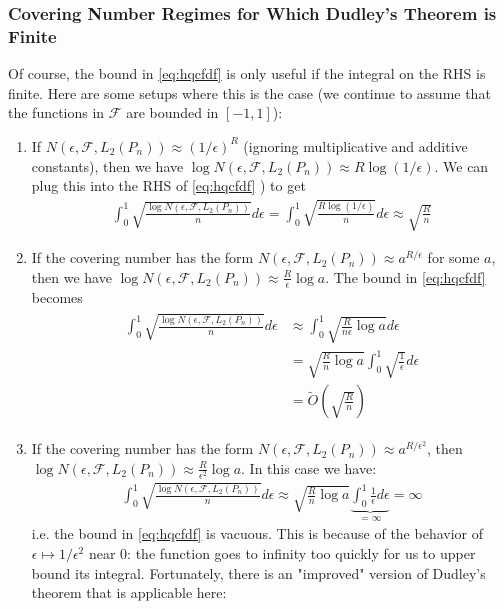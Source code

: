 \documentclass{article}
\begin{document}
\subsubsection{Covering Number Regimes for Which Dudley's Theorem is Finite}
Of course, the bound in \cref{eq:hqcfdf} is only useful if the integral on the RHS is finite. Here are some setups where this is the case (we continue to assume that the functions in $\mathcal{F}$ are bounded in $[-1,1]$):
\begin{enumerate}
    \item If $N\left(\epsilon, \mathcal{F}, L_{2}\left(P_{n}\right)\right) \approx(1 / \epsilon)^{R}$ (ignoring multiplicative and additive constants), then we have $\log N\left(\epsilon, \mathcal{F}, L_{2}\left(P_{n}\right)\right) \approx R \log (1 / \epsilon)$. We can plug this into the RHS of \cref{eq:hqcfdf} ) to get
\begin{align*}
\int_{0}^{1} \sqrt{\frac{\log N\left(\epsilon, \mathcal{F}, L_{2}\left(P_{n}\right)\right)}{n}} d \epsilon=\int_{0}^{1} \sqrt{\frac{R \log (1 / \epsilon)}{n}} d \epsilon \approx \sqrt{\frac{R}{n}}
\end{align*}
\item If the covering number has the form $N\left(\epsilon, \mathcal{F}, L_{2}\left(P_{n}\right)\right) \approx a^{R / \epsilon}$ for some $a$, then we have $\log N\left(\epsilon, \mathcal{F}, L_{2}\left(P_{n}\right)\right) \approx \frac{R}{\epsilon} \log a$. The bound in \cref{eq:hqcfdf} becomes
\begin{align*}
\begin{aligned}
\int_{0}^{1} \sqrt{\frac{\log N\left(\epsilon, \mathcal{F}, L_{2}\left(P_{n}\right)\right)}{n}} d \epsilon & \approx \int_{0}^{1} \sqrt{\frac{R}{n \epsilon} \log a} d \epsilon \\
&=\sqrt{\frac{R}{n} \log a} \int_{0}^{1} \sqrt{\frac{1}{\epsilon}} d \epsilon \\
&=\widetilde{O}\left(\sqrt{\frac{R}{n}}\right)
\end{aligned}
\end{align*}
\item If the covering number has the form $N\left(\epsilon, \mathcal{F}, L_{2}\left(P_{n}\right)\right) \approx a^{R / \epsilon^{2}}$, then $\log N\left(\epsilon, \mathcal{F}, L_{2}\left(P_{n}\right)\right) \approx \frac{R}{\epsilon^{2}} \log a$. In this case we have:
\begin{align*}
\int_{0}^{1} \sqrt{\frac{\log N\left(\epsilon, \mathcal{F}, L_{2}\left(P_{n}\right)\right)}{n}} d \epsilon \approx \sqrt{\frac{R}{n} \log a} \underbrace{\int_{0}^{1} \frac{1}{\epsilon} d \epsilon}_{=\infty}=\infty
\end{align*}
i.e. the bound in \cref{eq:hqcfdf} is vacuous. This is because of the behavior of $\epsilon \mapsto 1 / \epsilon^{2}$ near 0: the function goes to infinity too quickly for us to upper bound its integral. Fortunately, there is an "improved" version of Dudley's theorem that is applicable here:
\end{enumerate}
\end{document}
